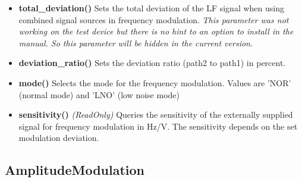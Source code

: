 \documentclass[11pt]{article} %
\begin{document}
\begin{itemize}
\item {\bf total\_deviation()} Sets the total deviation of the LF signal when using combined signal sources in frequency modulation.
	{\it This parameter was not working on the test device but there is no hint to an option to install in the manual. So this parameter will be hidden in the current version.}
\item {\bf deviation\_ratio()} Sets the deviation ratio (path2 to path1) in percent.
\item {\bf mode()} Selects the mode for the frequency modulation. Values are 'NOR' (normal mode) and 'LNO' (low noise mode)
\item {\bf sensitivity()} {\it (ReadOnly)} Queries the sensitivity of the externally supplied signal for frequency modulation in Hz/V. The sensitivity depends on the set modulation deviation.
\end{itemize}


\subsection{AmplitudeModulation}
\end{document}
